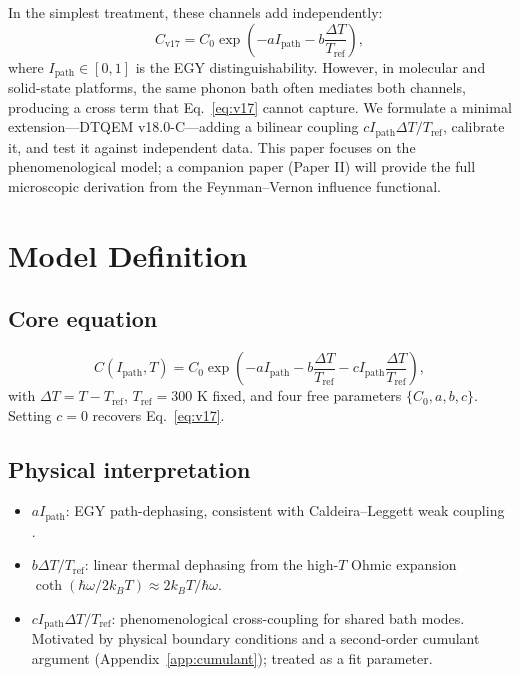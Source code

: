 \documentclass[aps,pra,reprint,amsmath,amssymb,superscriptaddress]{revtex4-2}
\begin{document}
In the simplest treatment, these channels add independently:
\begin{equation}
C_{\text{v17}} = C_0 \exp\left(-a I_{\text{path}} - b\frac{\Delta T}{T_{\text{ref}}}\right),
\label{eq:v17}
\end{equation}
where $I_{\text{path}} \in [0, 1]$ is the EGY distinguishability. However, in molecular and solid-state platforms, the same phonon bath often mediates both channels, producing a cross term that Eq.~\eqref{eq:v17} cannot capture. We formulate a minimal extension---DTQEM v18.0-C---adding a bilinear coupling $c I_{\text{path}} \Delta T/T_{\text{ref}}$, calibrate it, and test it against independent data. This paper focuses on the phenomenological model; a companion paper (Paper II) will provide the full microscopic derivation from the Feynman--Vernon influence functional.

\section{Model Definition}
\subsection{Core equation}
\begin{equation}
C(I_{\text{path}}, T) = C_0 \exp\left(-a I_{\text{path}} - b \frac{\Delta T}{T_{\text{ref}}} - c I_{\text{path}} \frac{\Delta T}{T_{\text{ref}}}\right),
\label{eq:v18}
\end{equation}
with $\Delta T = T - T_{\text{ref}}$, $T_{\text{ref}} = 300$ K fixed, and four free parameters $\{C_0, a, b, c\}$. Setting $c=0$ recovers Eq.~\eqref{eq:v17}.

\subsection{Physical interpretation}
\begin{itemize}
    \item $a I_{\text{path}}$: EGY path-dephasing, consistent with Caldeira--Leggett weak coupling \cite{Weiss2012}.
    \item $b\Delta T/T_{\text{ref}}$: linear thermal dephasing from the high-$T$ Ohmic expansion $\coth(\hbar\omega/2k_B T) \approx 2k_B T/\hbar\omega$.
    \item $c I_{\text{path}}\Delta T/T_{\text{ref}}$: phenomenological cross-coupling for shared bath modes. Motivated by physical boundary conditions and a second-order cumulant argument (Appendix~\ref{app:cumulant}); treated as a fit parameter.
\end{itemize}
\end{document}
